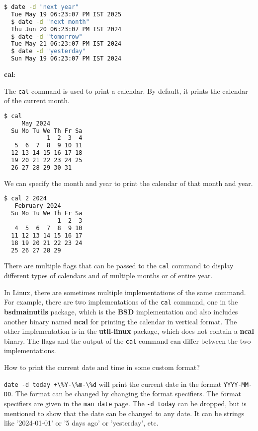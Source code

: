 \begin{lstlisting}[language=bash]
  $ date -d "next year"
  Tue May 19 06:23:07 PM IST 2025
  $ date -d "next month"
  Thu Jun 20 06:23:07 PM IST 2024
  $ date -d "tomorrow"
  Tue May 21 06:23:07 PM IST 2024
  $ date -d "yesterday"
  Sun May 19 06:23:07 PM IST 2024
\end{lstlisting}

\textbf{cal}:

The \lstinline|cal| command is used to print a calendar.
By default, it prints the calendar of the current month.

\begin{lstlisting}[language=bash]
  $ cal
     May 2024
  Su Mo Tu We Th Fr Sa
            1  2  3  4
   5  6  7  8  9 10 11
  12 13 14 15 16 17 18
  19 20 21 22 23 24 25
  26 27 28 29 30 31
\end{lstlisting}

We can specify the month and year to print the calendar of that month and year.

\begin{lstlisting}[language=bash]
  $ cal 2 2024
   February 2024
  Su Mo Tu We Th Fr Sa
               1  2  3
   4  5  6  7  8  9 10
  11 12 13 14 15 16 17
  18 19 20 21 22 23 24
  25 26 27 28 29
\end{lstlisting}

There are multiple flags that can be passed to the \lstinline|cal| command to display different types of calendars and of multiple months or of entire year.

\begin{remark}
  In Linux, there are sometimes multiple implementations of the same command.
  For example, there are two implementations of the \lstinline|cal| command, one in the \textbf{bsdmainutils} package, which is the \textbf{BSD} implementation and also includes another binary named \textbf{ncal} for printing the calendar in vertical format.
  The other implementation is in the \textbf{util-linux} package, which does not contain a \textbf{ncal} binary.
  The flags and the output of the \lstinline|cal| command can differ between the two implementations.
\end{remark}

\begin{qs}
  How to print the current date and time in some custom format?
\end{qs}

\begin{ans}
  \lstinline|date -d today +\%Y-\%m-\%d| will print the current date in the format
  \lstinline|YYYY-MM-DD|. The format can be changed by changing the format specifiers.
  The format specifiers are given in the \lstinline|man date| page. The \lstinline|-d today| can
  be dropped, but is mentioned to show that the date can be changed to any date.
  It can be strings like '2024-01-01' or '5 days ago' or 'yesterday', etc.
\end{ans}

